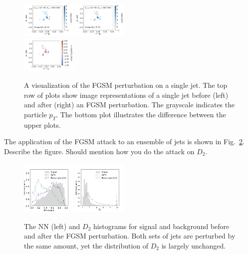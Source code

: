 \documentclass[reprint,nofootinbib,...]{revtex4-1}
\begin{document}
\begin{figure}[h!]
\centering
\includegraphics[width=0.23\textwidth]{figures/panel_1.pdf}
\includegraphics[width=0.23\textwidth]{figures/panel_2.pdf}\\
\includegraphics[width=0.23\textwidth]{figures/panel_3.pdf}
\caption{A visualization of the FGSM perturbation on a single jet.  The top row of plots show image representations of a single jet before (left) and after (right) an FGSM perturbation.  The grayscale indicates the particle $p_T$.  The bottom plot illustrates the difference between the upper plots.  }
\label{fig:FGSM}
\end{figure}

The application of the FGSM attack to an ensemble of jets is shown in Fig.~\ref{fig:FGSM2}.  Describe the figure.  Should mention how you do the attack on $D_2$.

\begin{figure}[h!]
\centering
\includegraphics[width=0.23\textwidth]{figures/NN_FGSM.pdf}
\includegraphics[width=0.23\textwidth]{figures/D2_FGSM.pdf}
\caption{The NN (left) and $D_2$ histograms for signal and background before and after the FGSM perturbation.  Both sets of jets are perturbed by the same amount, yet the distribution of $D_2$ is largely unchanged. }
\label{fig:FGSM2}
\end{figure}
\end{document}
